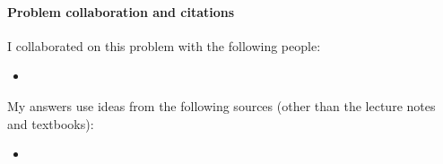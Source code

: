 \vfill

\paragraph{Problem  collaboration and citations}

I collaborated on this problem with the following people:
\begin{blue}
  \begin{itemize}
  \item \REPLACEME                    %
  \end{itemize}
\end{blue}

My answers use ideas from the following sources (other than the lecture notes and textbooks): 
\begin{blue}
  \begin{itemize}
  \item \REPLACEME                    %
  \end{itemize}
\end{blue}

